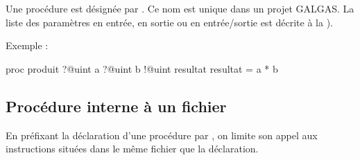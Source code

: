 Une procédure est désignée par . Ce nom est unique dans un projet GALGAS. La liste des paramètres en entrée, en sortie ou en entrée/sortie est décrite à la ).

Exemple :

\begin{galgascode}
proc produit ?@uint a ?@uint b !@uint resultat {
  resultat = a * b
}
\end{galgascode}



\subsection{Procédure interne à un fichier}

En préfixant la déclaration d'une procédure par , on limite son appel aux instructions situées dans le même fichier que la déclaration.



